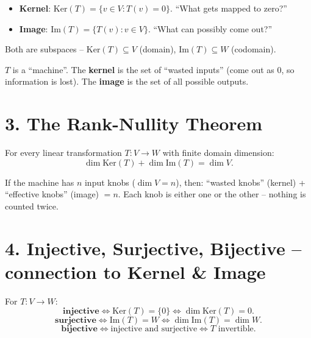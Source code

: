 \documentclass[a4paper,12pt]{article}
\begin{document}
\begin{merkbox}[title={Definitions}]
\begin{itemize}[nosep]
    \item \textbf{Kernel}: $\text{Ker}(T) = \{v \in V : T(v) = 0\}$. ``What gets mapped to zero?''
    \item \textbf{Image}: $\text{Im}(T) = \{T(v) : v \in V\}$. ``What can possibly come out?''
\end{itemize}
Both are subspaces -- $\text{Ker}(T) \subseteq V$ (domain), $\text{Im}(T) \subseteq W$ (codomain).
\end{merkbox}

\begin{analogie}
$T$ is a ``machine''. The \textbf{kernel} is the set of ``wasted inputs'' (come out as $0$, so information is lost). The \textbf{image} is the set of all possible outputs.
\end{analogie}

\section*{3. The Rank-Nullity Theorem}

\begin{merkbox}[title={The most important theorem}]
For every linear transformation $T \colon V \to W$ with finite domain dimension:
\[
\dim \text{Ker}(T) + \dim \text{Im}(T) = \dim V.
\]
\end{merkbox}

\begin{analogie}
If the machine has $n$ input knobs ($\dim V = n$), then: ``wasted knobs'' (kernel) + ``effective knobs'' (image) $= n$. Each knob is either one or the other -- nothing is counted twice.
\end{analogie}

\section*{4. Injective, Surjective, Bijective -- connection to Kernel \& Image}

\begin{merkbox}[title={Characterizations}]
For $T \colon V \to W$:
\[
\textbf{injective} \iff \text{Ker}(T) = \{0\} \iff \dim \text{Ker}(T) = 0.
\]
\[
\textbf{surjective} \iff \text{Im}(T) = W \iff \dim \text{Im}(T) = \dim W.
\]
\[
\textbf{bijective} \iff \text{injective and surjective} \iff T \text{ invertible}.
\]
\end{merkbox}
\end{document}
